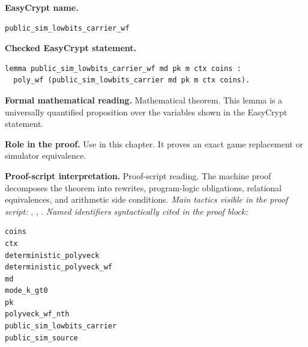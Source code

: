 \begin{formaltheorem}
\noindent\textbf{EasyCrypt name.}
\begin{lstlisting}[language=EasyCrypt,basicstyle=\ttfamily\scriptsize]
public_sim_lowbits_carrier_wf
\end{lstlisting}
\noindent\textbf{Checked EasyCrypt statement.}
\begin{lstlisting}[language=EasyCrypt,basicstyle=\ttfamily\scriptsize]
lemma public_sim_lowbits_carrier_wf md pk m ctx coins :
  poly_wf (public_sim_lowbits_carrier md pk m ctx coins).
\end{lstlisting}
\noindent\textbf{Formal mathematical reading.}
Mathematical theorem. This lemma is a universally quantified proposition over the variables shown in the EasyCrypt statement.

\noindent\textbf{Role in the proof.}
Use in this chapter. It proves an exact game replacement or simulator equivalence.

\noindent\textbf{Proof-script interpretation.}
Proof-script reading. The machine proof decomposes the theorem into rewrites, program-logic obligations, relational equivalences, and arithmetic side conditions.
\emph{Main tactics visible in the proof script:} , , .
\emph{Named identifiers syntactically cited in the proof block:}
\begin{lstlisting}[language=EasyCrypt,basicstyle=\ttfamily\scriptsize]
coins
ctx
deterministic_polyveck
deterministic_polyveck_wf
md
mode_k_gt0
pk
polyveck_wf_nth
public_sim_lowbits_carrier
public_sim_source
\end{lstlisting}

\end{formaltheorem}

